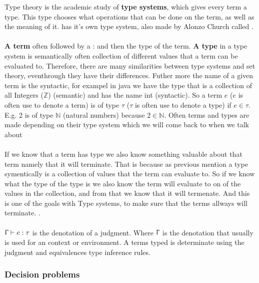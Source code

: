 Type theory is the academic study of \textbf{type systems}, 
which gives every term a type. This type chooses what operations 
that can be done on the term, as well as the meaning of it. 
 has it's own type system, also made 
by Alonzo Church called .
\\ \\
\textbf{A term} often followed by a : and then the type of the term.
\textbf{A type} in a type system is semantically often collection of different
values that a term can be evaluated to. Therefore, there are many 
similarities between type systems and set theory, eventhrough they 
have their differences. Futher more the name of a given term is the syntactic, 
for exampel in java we have the type that  is a collection of all Integers ($\mathbb{Z}$) (semantic) 
and has the name int (syntactic).
So a term $e$ ($e$ is often use to denote a term) is of type 
$\tau$ ($\tau$ is often use to denote a type) if $e \in \tau$. 
E.g. 2 is of type $\mathbb{N}$ (natural numbers) because 
$2 \in \mathbb{N}$. Often terms and types are made depending on their 
type system which we will come back to when we talk about 
\\ \\
If we know that a term has type we also know something valuable about that term namely that it will terminate.
That is because as previous mention a type symentically is a collection of values that the term can evaluate to. 
So if we know what the type of the type is we also know the term will evaluate to on of the values in the collection, and
from that we know that it will termenate. And this is one of the goals with Type systems, to make sure that the 
terms allways will terminate. 
. 
\\ \\
$\Upgamma \vdash e:\tau$ is the denotation of a judgment. 
Where $\Upgamma$ is the denotation that usually is used for an 
context or environment. A terms typed is determinate using the 
judgment and equivalences type inference rules.

\subsubsection{Decision problems}

